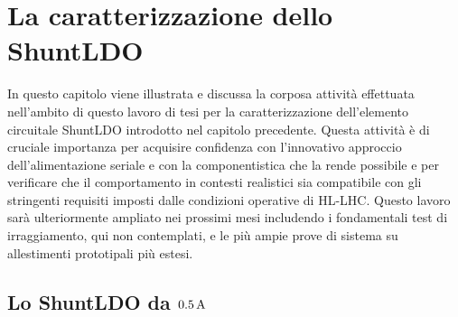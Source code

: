 
%

\chapter{La caratterizzazione dello ShuntLDO}

In questo capitolo viene illustrata e discussa la corposa attivit\`a effettuata nell'ambito di questo lavoro di tesi per la caratterizzazione dell'elemento circuitale ShuntLDO introdotto nel capitolo precedente. Questa attivit\`a \`e di cruciale importanza per acquisire confidenza con l'innovativo approccio dell'alimentazione seriale e con la componentistica che la rende possibile e per verificare che il comportamento in contesti realistici sia compatibile con gli stringenti requisiti imposti dalle condizioni operative di HL-LHC. Questo lavoro sar\`a ulteriormente ampliato nei prossimi mesi includendo i fondamentali test di irraggiamento, qui non contemplati, e le pi\`u ampie prove di sistema su allestimenti prototipali pi\`u estesi.

\section{Lo ShuntLDO da $0.5\rm \, A$}

